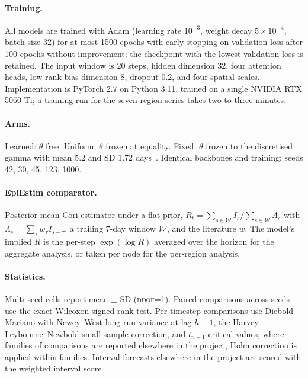 \documentclass[10pt,letterpaper]{article}
\begin{document}
\paragraph{Training.} All models are trained with Adam (learning rate
$10^{-3}$, weight decay $5\times10^{-4}$, batch size 32) for at most 1500
epochs with early stopping on validation loss after 100 epochs without
improvement; the checkpoint with the lowest validation loss is retained. The
input window is 20 steps, hidden dimension 32, four attention heads, low-rank
bias dimension 8, dropout 0.2, and four spatial scales. Implementation is
PyTorch 2.7 on Python 3.11, trained on a single NVIDIA RTX 5060 Ti; a training
run for the seven-region series takes two to three minutes.

\paragraph{Arms.} Learned: $\theta$ free. Uniform: $\theta$ frozen at
equality. Fixed: $\theta$ frozen to the discretised gamma with mean 5.2 and
SD 1.72 days~\cite{ferretti2020quantifying}. Identical backbones and
training; seeds 42, 30, 45, 123, 1000.

\paragraph{EpiEstim comparator.} Posterior-mean Cori estimator under a flat
prior, $R_t=\sum_{s\in\mathcal{W}} I_s / \sum_{s\in\mathcal{W}} \Lambda_s$
with $\Lambda_s=\sum_\tau w_\tau I_{s-\tau}$, a trailing 7-day window
$\mathcal{W}$, and the literature $w$. The model's implied $R$ is the
per-step $\exp(\log R)$ averaged over the horizon for the aggregate analysis,
or taken per node for the per-region analysis.

\paragraph{Statistics.} Multi-seed cells report mean $\pm$ SD
(\textsc{ddof}=1). Paired comparisons across seeds use the exact Wilcoxon
signed-rank test. Per-timestep comparisons use Diebold--Mariano with
Newey--West long-run variance at lag $h-1$, the Harvey--Leybourne--Newbold
small-sample correction, and $t_{n-1}$ critical values; where families of
comparisons are reported elsewhere in the project, Holm correction is applied
within families. Interval forecasts elsewhere in the project are scored with
the weighted interval score~\cite{bracher2021evaluating}.
\end{document}
